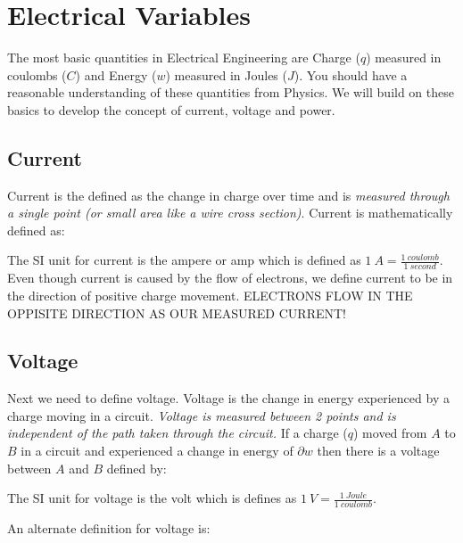 \documentclass{handout}
\begin{document}
\section{Electrical Variables}
The most basic quantities in Electrical Engineering are Charge ($q$) measured in coulombs ($C$) and Energy ($w$) measured in Joules ($J$).  You should have a reasonable understanding of these quantities from Physics.  We will build on these basics to develop the concept of current, voltage and power.

\subsection{Current}
Current is the defined as the change in charge over time and is {\em measured through a single point (or small area like a wire cross section)}. Current is mathematically defined as:


The SI unit for current is the ampere or amp which is defined as $1\ A = \frac{1\ coulomb}{1\ second}$. Even though current is caused by the flow of electrons, we define current to be in the direction of positive charge movement.  ELECTRONS FLOW IN THE OPPISITE DIRECTION AS OUR MEASURED CURRENT!

\subsection{Voltage}
Next we need to define voltage.  Voltage is the change in energy experienced by a charge moving in a circuit. {\em Voltage is measured between 2 points and is independent of the path taken through the circuit. }
If a charge ($q$) moved from $A$ to $B$ in a circuit and experienced a change in energy of $\partial w$ then there is a voltage between $A$ and $B$ defined by:

The SI unit for voltage is the volt which is defines as $1\ V = \frac{1\ Joule}{1\ coulomb}$.

An alternate definition for voltage is:
\end{document}
